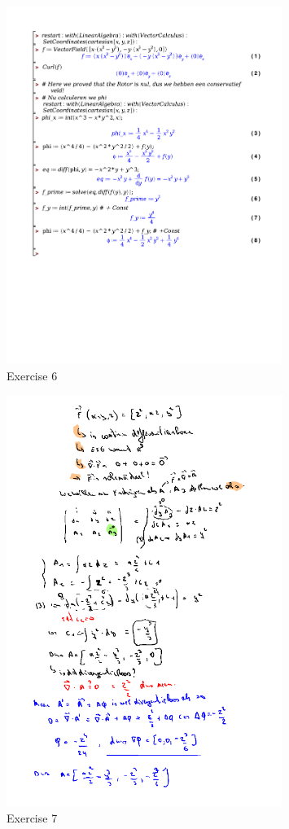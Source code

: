 \documentclass[a4paper]{report}
\begin{document}
\begin{figure}[H]
	\centering
	\includegraphics[width=0.8\textwidth]{exercises/huis_6_ex_6.pdf}
	\caption{Exercise 6}
	\label{fig:huis_6_ex_6_maple}
\end{figure}

\begin{figure}[H]
	\centering
	\includegraphics[width=0.8\textwidth]{assets/huis_6_ex_7.png}
	\caption{Exercise 7}
	\label{fig:huis_6_ex_7}
\end{figure}
\end{document}
